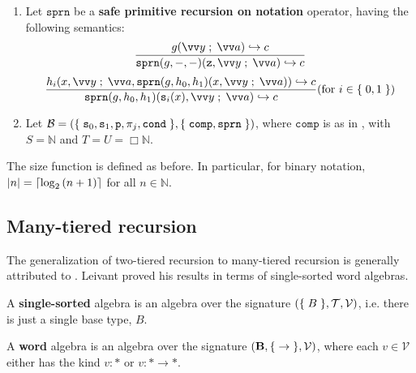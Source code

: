 \begin{definition}
\begin{enumerate}[label=(\arabic*)]
\item Let $\mathtt{sprn}$ be a \textbf{safe primitive recursion on notation}
operator, having the following semantics:\begin{align*}
%
\judgement{
%
  g\p{\vect{y} \semic{} \vect{a}} \goesto c
%
}{
%
  \mathtt{sprn}\p{g,-,-}\p{\mathtt{z}, \vect{y} \semic{} \vect{a}} \goesto c
%
}\end{align*}\begin{align*}
%
\judgement{
%
  h_i\p{x, \vect{y} \semic{} \vect{a}, \mathtt{sprn}\p{g,h_0,h_1}\p{x,\vect{y}
\semic{} \vect{a}}} \goesto c
%
}{
%
  \mathtt{sprn}\p{g,h_0,h_1}\p{\mathtt{s}_i\p{x}, \vect{y} \semic{} \vect{a}}
\goesto c
%
}\p{\text{for $i\in\set{0,1}$}}
%
\end{align*}

\item Let $\mathcal{B} = {\mathopen{}\left({\mathopen{}\left\{\mathrel{}{\mathtt{s}_0, \mathtt{s}_1, \mathtt{p}, \pi_j,
\mathtt{cond}}\mathrel{}\right\}\mathclose{},\mathopen{}\left\{\mathrel{}{\mathtt{comp}, \mathtt{sprn}}\mathrel{}\right\}\mathclose{}}\right)\mathclose{}} $, where $\mathtt{comp}$ is
as in , with $S=\mathbb{N}$ and $T=U=\Box\mathbb{N}$.

\end{enumerate}

\end{definition}

\begin{remark} The size function is defined as before. In particular, for
binary notation, ${\mathopen{}\left|{n}\right|\mathclose{}}=\mathopen{}\left\lceil{\log_2{\ensuremath{\mathopen{}\left({n+1}\right)\mathclose{}}}}\right\rceil\mathclose{}$ for all $n \in \mathbb{N}$.
\end{remark}

\subsection{Many-tiered recursion}

The generalization of two-tiered recursion to many-tiered recursion is
generally attributed to \cite{leivant-1995}. Leivant proved his results in
terms of single-sorted word algebras.

\begin{definition} A \textbf{single-sorted} algebra is an algebra over the
signature ${\mathopen{}\left({\mathopen{}\left\{\mathrel{}{B}\mathrel{}\right\}\mathclose{}, \mathcal{T}, \mathcal{V}}\right)\mathclose{}}$, i.e. there is just a single
base type, $B$. \end{definition}

\begin{definition} A \textbf{word} algebra is an algebra over the signature
${\mathopen{}\left({\mathbf{B}, \mathopen{}\left\{\mathrel{}{\rightarrow}\mathrel{}\right\}\mathclose{}, \mathcal{V}}\right)\mathclose{}}$, where each $v \in
\mathcal{V}$ either has the kind $v : *$ or $v : *\rightarrow *$.
\end{definition}

